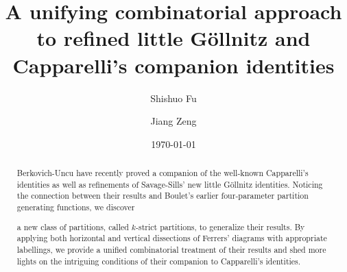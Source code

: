 \documentclass[12pt]{amsart}
\numberwithin{equation}{section}
\theoremstyle{plain}
\theoremstyle{definition}
\begin{document}
\title[unified approach]
{A unifying combinatorial approach to refined little G\"{o}llnitz and Capparelli's
companion  identities}
\author[S. Fu]{Shishuo Fu}
\address[Shishuo Fu]{College of Mathematics and Statistics, Chongqing University, Huxi campus building LD506, Chongqing 401331, P.R. China} 


\author[J. Zeng]{Jiang Zeng}

\address[Jiang Zeng]{Univ Lyon, Universit\'e Claude Bernard Lyon 1, CNRS UMR 5208, Institut Camille Jordan, 43 blvd. du 11 novembre 1918, F-69622 Villeurbanne cedex, France}
  
\date{\today}

\begin{abstract}
Berkovich-Uncu have recently proved a
companion  of the well-known Capparelli's identities as well as 
refinements of Savage-Sills' new little G\"{o}llnitz identities. Noticing the connection between their results  and  
Boulet's earlier four-parameter partition generating functions, we discover

a new class of partitions, called $k$-strict partitions, to generalize their results.
By applying both horizontal and vertical dissections of Ferrers' diagrams with appropriate labellings, we provide  a unified combinatorial treatment 
of their results and shed more lights on the intriguing conditions of their companion to Capparelli's identities.









\end{abstract}

\maketitle

\tableofcontents
\end{document}
